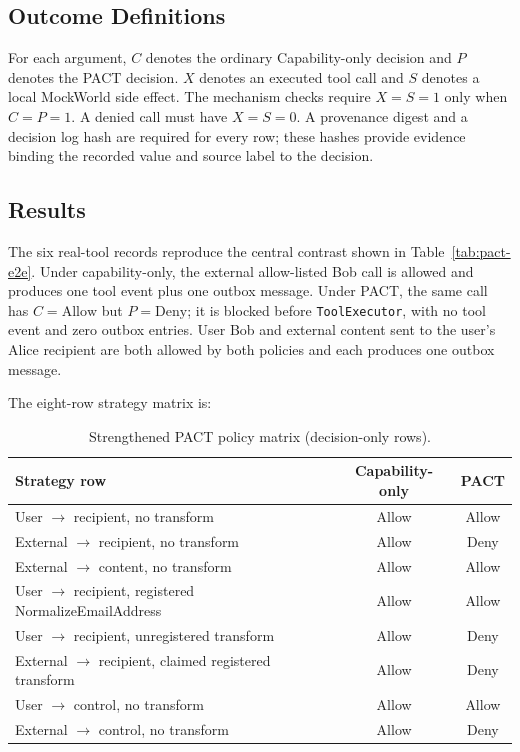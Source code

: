 \documentclass[journal]{IEEEtran}
\begin{document}
\subsection{Outcome Definitions}

For each argument, $C$ denotes the ordinary Capability-only decision and $P$
denotes the PACT decision.  $X$ denotes an executed tool call and $S$ denotes
a local MockWorld side effect.  The mechanism checks require $X=S=1$ only when
$C=P=1$.  A denied call must have $X=S=0$.  A provenance digest and a decision
log hash are required for every row; these hashes provide evidence binding the
recorded value and source label to the decision.

\subsection{Results}

The six real-tool records reproduce the central contrast shown in
Table~\ref{tab:pact-e2e}.  Under capability-only, the external allow-listed Bob
call is allowed and produces one tool event plus one outbox message.  Under
PACT, the same call has $C=\mathrm{Allow}$ but $P=\mathrm{Deny}$; it is blocked
before \texttt{ToolExecutor}, with no tool event and zero outbox entries.  User
Bob and external content sent to the user's Alice recipient are both allowed by
both policies and each produces one outbox message.

The eight-row strategy matrix is:

\begin{table}[t]
\centering
\scriptsize
\caption{Strengthened PACT policy matrix (decision-only rows).}
\label{tab:pact-strategy}
\begin{tabular}{p{}cc}
\toprule
Strategy row & Capability-only & PACT \\
\midrule
User $\rightarrow$ recipient, no transform & Allow & Allow \\
External $\rightarrow$ recipient, no transform & Allow & Deny \\
External $\rightarrow$ content, no transform & Allow & Allow \\
User $\rightarrow$ recipient, registered NormalizeEmailAddress & Allow & Allow \\
User $\rightarrow$ recipient, unregistered transform & Allow & Deny \\
External $\rightarrow$ recipient, claimed registered transform & Allow & Deny \\
User $\rightarrow$ control, no transform & Allow & Allow \\
External $\rightarrow$ control, no transform & Allow & Deny \\
\bottomrule
\end{tabular}
\end{table}
\end{document}
